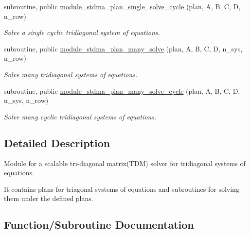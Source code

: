 \begin{DoxyCompactItemize}
subroutine, public \mbox{\hyperlink{namespacemodule__stdma_ae0554602dc9cb19da09c0555f12e1312}{module\+\_\+stdma\+\_\+plan\+\_\+single\+\_\+solve\+\_\+cycle}} (plan, A, B, C, D, n\+\_\+row)
\begin{DoxyCompactList}\small\item\em Solve a single cyclic tridiagonal system of equations. \end{DoxyCompactList}\item 
subroutine, public \mbox{\hyperlink{namespacemodule__stdma_aa0817e49b29e14abc90f0aab91c4c2d9}{module\+\_\+stdma\+\_\+plan\+\_\+many\+\_\+solve}} (plan, A, B, C, D, n\+\_\+sys, n\+\_\+row)
\begin{DoxyCompactList}\small\item\em Solve many tridiagonal systems of equations. \end{DoxyCompactList}\item 
subroutine, public \mbox{\hyperlink{namespacemodule__stdma_ab9a4a74a41d0b04823b5ac26f58a9733}{module\+\_\+stdma\+\_\+plan\+\_\+many\+\_\+solve\+\_\+cycle}} (plan, A, B, C, D, n\+\_\+sys, n\+\_\+row)
\begin{DoxyCompactList}\small\item\em Solve many cyclic tridiagonal systems of equations. \end{DoxyCompactList}\end{DoxyCompactItemize}


\subsection{Detailed Description}
Module for a scalable tri-\/diagonal matrix(\+T\+D\+M) solver for tridiagonal systems of equations. 

It contains plans for triagonal systems of equations and subroutines for solving them under the defined plans. 

\subsection{Function/\+Subroutine Documentation}
\mbox{\label{namespacemodule__stdma_ac68f17b987232c3daacbb844bd52d67e}} 
